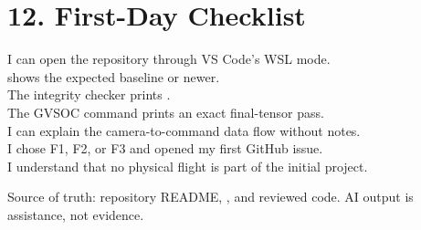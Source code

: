 \documentclass[11pt]{article}
\begin{document}
\section{12. First-Day Checklist}

\checkbox I can open the repository through VS Code's WSL mode.\\
\checkbox {} shows the expected baseline or newer.\\
\checkbox The integrity checker prints \good.\\
\checkbox The GVSOC command prints an exact final-tensor pass.\\
\checkbox I can explain the camera-to-command data flow without notes.\\
\checkbox I chose F1, F2, or F3 and opened my first GitHub issue.\\
\checkbox I understand that no physical flight is part of the initial project.

\vfill
{\small\color{navy}Source of truth: repository README, , and reviewed code. AI output is assistance, not evidence.}
\end{document}
